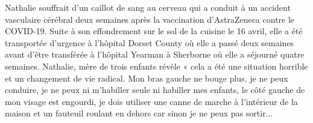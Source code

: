 Nathalie souffrait d’un caillot de sang au cerveau qui a conduit à un accident
vasculaire cérébral deux semaines après la vaccination d’AstraZeneca contre le
COVID-19. Suite à son effondrement sur le sol de la cuisine le 16 avril, elle a
été transportée d’urgence à l’hôpital Dorset County où elle a passé deux
semaines avant d’être transférée à l’hôpital Yearman à Sherborne où elle a
séjourné quatre semaines. Nathalie, mère de trois enfants révèle « cela a été
une situation horrible et un changement de vie radical. Mon bras gauche ne bouge
plus, je ne peux conduire, je ne peux ni m’habiller seule ni habiller mes
enfants, le côté gauche de mon visage est engourdi, je dois utiliser une canne
de marche à l’intérieur de la maison et un fauteuil roulant en dehors car sinon
je ne peux pas sortir...

